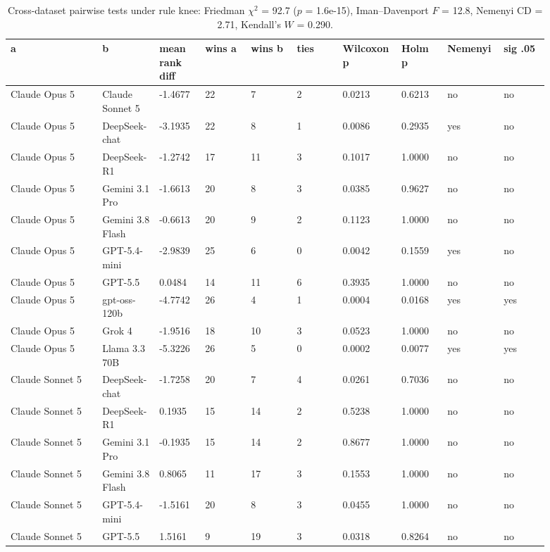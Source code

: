 \begin{landscape}
\tiny
\setlength{\tabcolsep}{3pt}
\begin{longtable}{p{0.162\linewidth}p{0.081\linewidth}p{0.081\linewidth}p{0.081\linewidth}p{0.081\linewidth}p{0.081\linewidth}p{0.081\linewidth}p{0.081\linewidth}p{0.081\linewidth}p{0.081\linewidth}}
\caption{Cross-dataset pairwise tests under rule knee: Friedman $\chi^2$ = 92.7 ($p$ = 1.6e-15), Iman--Davenport $F$ = 12.8, Nemenyi CD = 2.71, Kendall's $W$ = 0.290.}\label{tab:pairwise_pareto_knee}\\
\toprule
a & b & mean rank diff & wins a & wins b & ties & Wilcoxon p & Holm p & Nemenyi & sig .05 \\
\midrule
Claude Opus 5 & Claude Sonnet 5 & -1.4677 & 22 & 7 & 2 & 0.0213 & 0.6213 & no & no \\
Claude Opus 5 & DeepSeek-chat & -3.1935 & 22 & 8 & 1 & 0.0086 & 0.2935 & yes & no \\
Claude Opus 5 & DeepSeek-R1 & -1.2742 & 17 & 11 & 3 & 0.1017 & 1.0000 & no & no \\
Claude Opus 5 & Gemini 3.1 Pro & -1.6613 & 20 & 8 & 3 & 0.0385 & 0.9627 & no & no \\
Claude Opus 5 & Gemini 3.8 Flash & -0.6613 & 20 & 9 & 2 & 0.1123 & 1.0000 & no & no \\
Claude Opus 5 & GPT-5.4-mini & -2.9839 & 25 & 6 & 0 & 0.0042 & 0.1559 & yes & no \\
Claude Opus 5 & GPT-5.5 & 0.0484 & 14 & 11 & 6 & 0.3935 & 1.0000 & no & no \\
Claude Opus 5 & gpt-oss-120b & -4.7742 & 26 & 4 & 1 & 0.0004 & 0.0168 & yes & yes \\
Claude Opus 5 & Grok 4 & -1.9516 & 18 & 10 & 3 & 0.0523 & 1.0000 & no & no \\
Claude Opus 5 & Llama 3.3 70B & -5.3226 & 26 & 5 & 0 & 0.0002 & 0.0077 & yes & yes \\
Claude Sonnet 5 & DeepSeek-chat & -1.7258 & 20 & 7 & 4 & 0.0261 & 0.7036 & no & no \\
Claude Sonnet 5 & DeepSeek-R1 & 0.1935 & 15 & 14 & 2 & 0.5238 & 1.0000 & no & no \\
Claude Sonnet 5 & Gemini 3.1 Pro & -0.1935 & 15 & 14 & 2 & 0.8677 & 1.0000 & no & no \\
Claude Sonnet 5 & Gemini 3.8 Flash & 0.8065 & 11 & 17 & 3 & 0.1553 & 1.0000 & no & no \\
Claude Sonnet 5 & GPT-5.4-mini & -1.5161 & 20 & 8 & 3 & 0.0455 & 1.0000 & no & no \\
Claude Sonnet 5 & GPT-5.5 & 1.5161 & 9 & 19 & 3 & 0.0318 & 0.8264 & no & no \\

\end{longtable}
\end{landscape}
